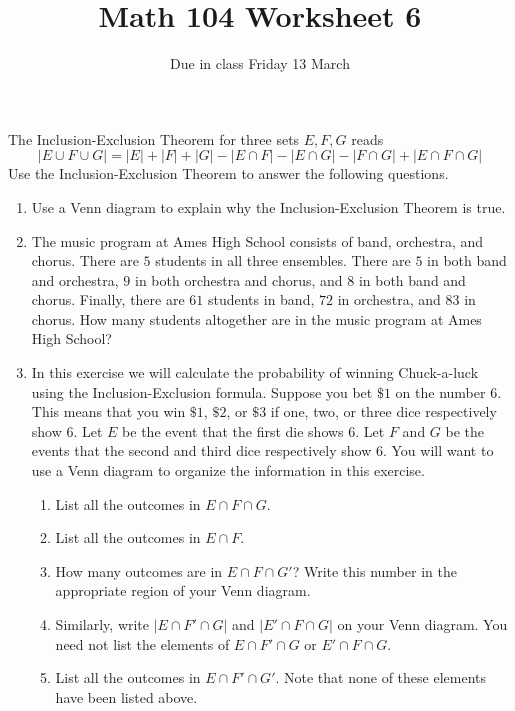 \documentclass[12pt]{article}
\author{}\date{Due in class Friday 13 March}
\title{Math 104 Worksheet 6}\author{}
\begin{document}
\maketitle
\thispagestyle{empty}

The Inclusion-Exclusion Theorem for three sets $E,F,G$ reads
\[\left|E\cup F\cup G\right|
=\left|E\right|+\left|F\right|+\left|G\right|
-\left|E\cap F\right|
-\left|E\cap G\right|
-\left|F\cap G\right|
+\left|E\cap F\cap G\right|\]
Use the Inclusion-Exclusion Theorem to answer the following questions.
\begin{enumerate}
\item Use a Venn diagram to explain why
the Inclusion-Exclusion Theorem is true.
\vspace{2in}
\item The music program at Ames High School
consists of band, orchestra, and chorus. There are
$5$ students in all three ensembles.
There are $5$ in both band and orchestra, $9$
in both orchestra and chorus, and $8$ in both band
and chorus. Finally, there are $61$ students in band,
$72$ in orchestra, and $83$ in chorus. How many students
altogether are in the music program at Ames High School?
\vspace{2in}
\item In this exercise we
will calculate the probability of winning
Chuck-a-luck using the Inclusion-Exclusion formula.
Suppose you bet $\$1$ on the number 6.
This means that you win $\$1$, $\$2$, or $\$3$ 
if one, two, or three dice respectively show 6.
Let $E$ be the event that the first die shows 6.
Let $F$ and $G$ be the events that the second
and third dice respectively show 6.
You will want to use a Venn diagram to organize the
information in this exercise.
\begin{enumerate}
\item List all the outcomes in $E\cap F\cap G$.
\vspace{.5in}
\item List all the outcomes in $E\cap F$.
\vspace{.5in}
\item How many outcomes are in $E\cap F\cap G'$?
Write this number in the appropriate region of your
Venn diagram.
\item Similarly, write $\left|E\cap F'\cap G\right|$
and $\left|E'\cap F\cap G\right|$ on your Venn diagram.
You need not list the elements of $E\cap F'\cap G$
or $E'\cap F\cap G$.
\item List all the outcomes in $E\cap F'\cap G'$.
Note that none of these elements have been listed above.

\end{enumerate}
\end{enumerate}
\end{document}
